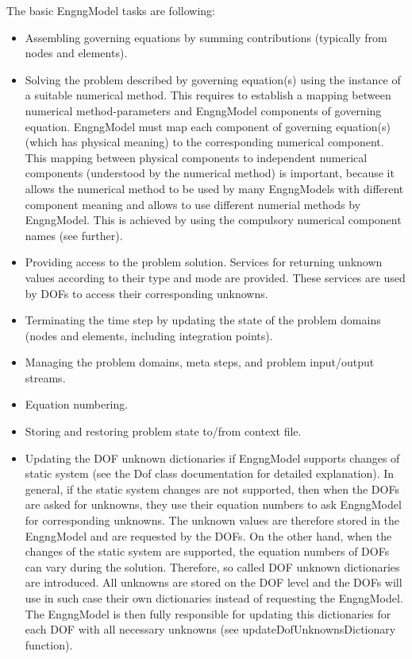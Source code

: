 \documentclass[12pt,draft]{article}
\begin{document}
The basic EngngModel tasks are following:
\begin{itemize}
\item
Assembling governing equations by summing contributions 
(typically from nodes and elements).
\item
Solving the problem described by governing equation(s) using the instance of
a suitable numerical method. This requires to establish a mapping between numerical method-parameters 
and EngngModel components of governing equation.
EngngModel must map each component of governing
equation(s) (which has physical meaning) to the corresponding numerical component.
This mapping between physical components to independent numerical components 
(understood by the numerical method) is important, because it allows
the numerical method to be used by
many EngngModels with different component meaning and allows to use 
different numerial methods by EngngModel. This is achieved by using
the compulsory numerical component names (see further).
\item
Providing access to the problem solution. Services for returning unknown
values according to their type and mode are provided. These services are used by DOFs to 
access their corresponding unknowns.
\item
Terminating the time step by updating the state of the problem domains (nodes and
elements, including integration points).
\item
Managing the problem domains, meta steps, and problem input/output
streams.
\item
Equation numbering.
\item 
Storing and restoring problem state to/from context file.
\item
Updating the DOF unknown dictionaries if EngngModel supports changes of
static system (see the Dof class 
documentation for detailed explanation). In general, if the static system changes are not supported,
then when the DOFs are asked for unknowns, they use their equation numbers to ask EngngModel
for corresponding unknowns. The unknown values are therefore stored in
the EngngModel and are requested by the DOFs.
On the other hand, when the changes of the static system are supported, the equation numbers of DOFs 
can vary during the solution. Therefore, so called DOF unknown dictionaries are introduced.
All unknowns are stored on the DOF level and the DOFs will use in such case their own dictionaries
instead of requesting the EngngModel. The EngngModel is then fully responsible for updating this
dictionaries for each DOF with all necessary unknowns (see updateDofUnknownsDictionary function).
\end{itemize}
\end{document}
